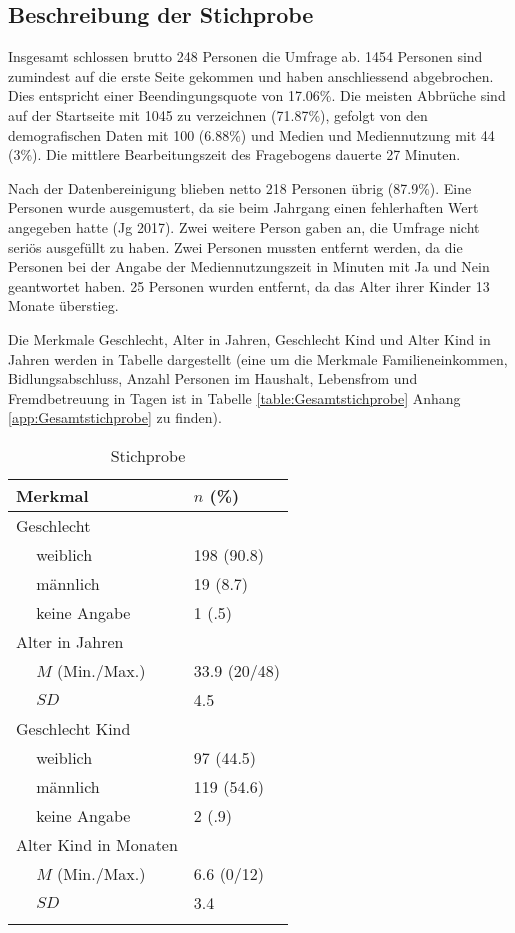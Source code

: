 \subsection{Beschreibung der Stichprobe}
Insgesamt schlossen brutto 248 Personen die Umfrage ab. 1454 Personen sind zumindest auf die erste Seite gekommen und haben anschliessend abgebrochen. Dies entspricht einer Beendingungsquote von 17.06\%. Die meisten Abbrüche sind auf der Startseite mit 1045 zu verzeichnen (71.87\%), gefolgt von den demografischen Daten mit 100 (6.88\%) und Medien und Mediennutzung mit 44 (3\%). Die mittlere Bearbeitungszeit des Fragebogens dauerte 27 Minuten. 

Nach der Datenbereinigung blieben netto 218 Personen übrig (87.9\%). Eine Personen wurde ausgemustert, da sie beim Jahrgang einen fehlerhaften Wert angegeben hatte (Jg 2017). Zwei weitere Person gaben an, die Umfrage nicht seriös ausgefüllt zu haben. Zwei Personen mussten entfernt werden, da die Personen bei der Angabe der Mediennutzungszeit in Minuten mit Ja und Nein geantwortet haben. 25 Personen wurden entfernt, da das Alter ihrer Kinder 13 Monate überstieg. 

Die Merkmale Geschlecht, Alter in Jahren, Geschlecht Kind und Alter Kind in Jahren werden in Tabelle  dargestellt (eine um die Merkmale Familieneinkommen, Bidlungsabschluss, Anzahl Personen im Haushalt, Lebensfrom und Fremdbetreuung in Tagen ist in Tabelle \ref{table:Gesamtstichprobe} Anhang \ref{app:Gesamtstichprobe} zu finden).

\begin{table}[htbp]

\begin{tabular}{m{0.5em}  m{10em}  m{5em}} 
  \hline\hline
  \multicolumn{2}{l}{\textbf{Merkmal}} & \textbf{$n$ (\%)} \\
  \hline
  \multicolumn{2}{l}{Geschlecht} \\ 
   & weiblich & 198 (90.8)\\ 
   & männlich & 19 (8.7)\\ 
   & keine Angabe & 1 (.5)\\ 
   
  \multicolumn{2}{l}{Alter in Jahren} \\
   & $M$ (Min./Max.) & 33.9 (20/48) \\
   & $SD$ & 4.5 \\
  
  \multicolumn{2}{l}{Geschlecht Kind} \\
   & weiblich & 97 (44.5)\\ 
   & männlich & 119 (54.6)\\ 
   & keine Angabe & 2 (.9)\\
  
  \multicolumn{2}{l}{Alter Kind in Monaten} \\
   &  $M$ (Min./Max.) & 6.6 (0/12)\\
   & $SD$ & 3.4\\
  \hline\hline
  &&\\
\end{tabular}
\caption{Stichprobe}
\label{table:Stichprobe}
\end{table}

